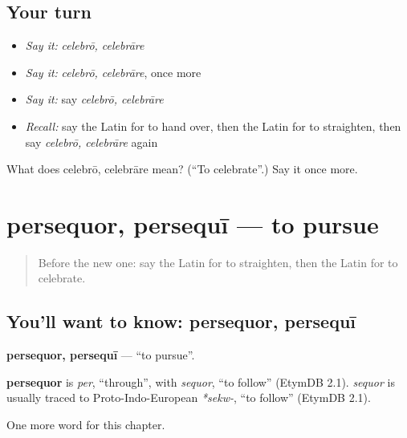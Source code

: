 \subsection*{Your turn}
\begin{itemize}
\raggedright
  \item \emph{Say it:} \emph{celebrō, celebrāre}
  \item \emph{Say it:} \emph{celebrō, celebrāre}, once more
  \item \emph{Say it:} say \emph{celebrō, celebrāre}
  \item \emph{Recall:} say the Latin for to hand over, then the Latin for to straighten, then say \emph{celebrō, celebrāre} again
\end{itemize}

\begin{tcolorbox}[breakable,colback=teal!4,colframe=teal!35!black,title={Before you move on}]
What does celebrō, celebrāre mean? (\textquotedblleft{}To celebrate\textquotedblright{}.) Say it once more.
\end{tcolorbox}
\section[persequor, persequī]{persequor, persequī — to pursue}

\label{lesson:LA-C201-persequor}



\begin{quote}
Before the new one: say the Latin for to straighten, then the Latin for to celebrate.
\end{quote}

\subsection*{You'll want to know: persequor, persequī}
\textbf{persequor, persequī} — \textquotedblleft{}to pursue\textquotedblright{}.

\begin{cousinweb}
\textbf{persequor} is \emph{per}, \textquotedblleft{}through\textquotedblright{}, with \emph{sequor}, \textquotedblleft{}to follow\textquotedblright{} (EtymDB 2.1). \emph{sequor} is usually traced to Proto-Indo-European \emph{*sekw-}, \textquotedblleft{}to follow\textquotedblright{} (EtymDB 2.1).
\end{cousinweb}

\begin{grammarlens}[title={What you've built}]
One more word for this chapter.
\end{grammarlens}

